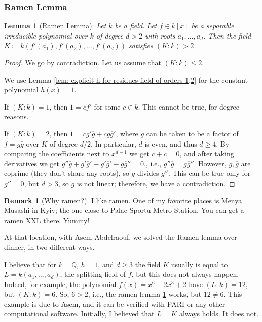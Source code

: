 \documentclass{amsart}
\newtheorem{lemma}[thm]{Lemma}
\theoremstyle{definition}
\newtheorem{remark}[thm]{Remark}
\begin{document}
\subsubsection{Ramen Lemma}

\begin{lemma}[Ramen Lemma]\label{lem: ramen lemma}
    Let $k$ be a field. Let $f\in k[x]$ be a separable irreducible polynomial over $k$ of degree $d>2$ with roots $a_1,\ldots,a_d$.
    Then the field $K\coloneqq k\left(f'(a_1),f'(a_2),\ldots,f'(a_d)\right)$
    satisfies $(K:k) > 2$.
\end{lemma}

\begin{proof}
    We go by contradiction. Let us assume that $(K:k) \le 2$.
    
    We use Lemma \ref{lem: explicit h for residues field of orders 1,2} for the constant polynomial $h(x)=1$. 
    
    If $(K:k)=1$, then $1=cf'$ for some $c\in k$. This cannot be true, for degree reasons. 
    
    If $(K:k)=2$, then $1=cg' \overline{g}+ \overline{c}g\overline{g}'$, where $g$ can be taken to be a factor of $f=g\overline{g}$ over $K$ of degree $d/2$. In particular, $d$ is even, and thus $d\ge 4$. By comparing the coefficients next to $x^{d-1}$ we get $c+\overline{c}=0$, and after taking derivatives we get
    $
    g'' \overline{g}+g' \overline{g}'-g'\overline{g}'-g\overline{g}''=0.
    $, i.e., $g'' \overline{g}=g\overline{g}''$. However, $g,\overline{g}$ are coprime (they don't share any roots), so $g$ divides $g''$. This can be true only for $g''=0$, but $d>3$, so $g$ is not linear; therefore, we have a contradiction.
\end{proof}

\begin{remark}[Why ramen?]
    I like ramen. One of my favorite places is Menya Musashi in Kyiv; the one close to Palac Sportu Metro Station. You can get a ramen XXL there. Yummy!

    At that location, 
    with Asem Abdelraouf, we solved the Ramen lemma over dinner, in two different ways.

    I believe that for $k=\mathbb{Q}$, $h=1$, and $d\ge 3$ the field $K$ usually is equal to $L=k(a_1,\ldots,a_d)$, the splitting field of $f$, but this does not always happen. Indeed, for example, the polynomial $f(x)=x^6-2x^3+2$ have $(L:k)=12$, but $(K:k)=6$. So, $6>2$, i.e., the ramen lemma \ref{lem: ramen lemma} works, but $12\ne 6$. This example is due to Asem, and it can be verified with PARI or any other computational software. Initially, I believed that $L=K$ always holds. It does not.
\end{remark}
\end{document}
